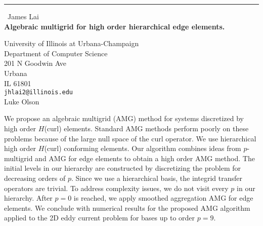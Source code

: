 \documentclass{report}
\begin{document}
\begin{center}
\rule{6in}{1pt} \
{\large James Lai \\
{\bf Algebraic multigrid for high order hierarchical edge elements.}}

University of Illinois at Urbana-Champaign \\ Department of Computer Science \\ 201 N Goodwin Ave \\ Urbana \\ IL 61801
\\
{\tt jhlai2@illinois.edu}\\
Luke Olson\end{center}

We propose an algebraic multigrid (AMG) method for systems discretized by
high order $H$(curl) elements. Standard AMG methods perform poorly on
these problems because of the large null space of the curl operator. We
use hierarchical high order $H$(curl) conforming elements. Our algorithm
combines ideas from $p$-multigrid and AMG for edge elements to obtain a
high order AMG method. The initial levels in our hierarchy are
constructed by discretizing the problem for decreasing orders of $p$.
Since we use a hierarchical basis, the integrid transfer operators are
trivial. To address complexity issues, we do not visit every $p$ in our
hierarchy. After $p=0$ is reached, we apply smoothed aggregation AMG for
edge elements. We conclude with numerical results for the proposed AMG
algorithm applied to the 2D eddy current problem for bases up to order
$p=9$.
\end{document}
